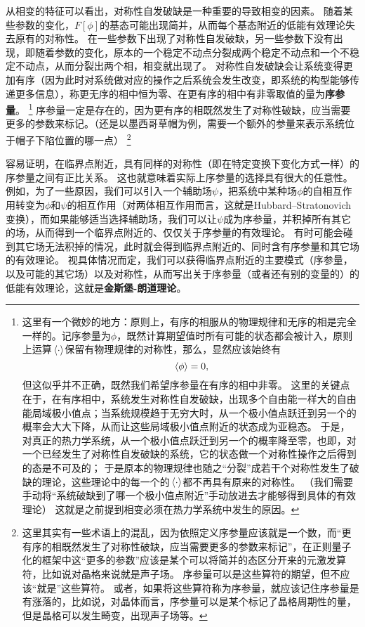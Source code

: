 \documentclass[hyperref, UTF8, a4paper]{ctexart}
\begin{document}
从相变的特征可以看出，对称性自发破缺是一种重要的导致相变的因素。
随着某些参数的变化，$F[\phi]$的基态可能出现简并，从而每个基态附近的低能有效理论失去原有的对称性。
在一些参数下出现了对称性自发破缺，另一些参数下没有出现，即随着参数的变化，原本的一个稳定不动点分裂成两个稳定不动点和一个不稳定不动点，从而分裂出两个相，相变就出现了。
对称性自发破缺会让系统变得更加有序（因为此时对系统做对应的操作之后系统会发生改变，即系统的构型能够传递更多信息），称更无序的相中恒为零、在更有序的相中有非零取值的量为\textbf{序参量}。%
\footnote{这里有一个微妙的地方：原则上，有序的相服从的物理规律和无序的相是完全一样的。记序参量为$\phi$，既然计算期望值时所有可能的状态都会被计入，原则上运算$\expval*{\cdot}$保留有物理规律的对称性，那么，显然应该始终有
\[
    \expval*{\phi} = 0,
\]
但这似乎并不正确，既然我们希望序参量在有序的相中非零。
这里的关键点在于，在有序相中，系统发生对称性自发破缺，出现多个自由能一样大的自由能局域极小值点；当系统规模趋于无穷大时，从一个极小值点跃迁到另一个的概率会大大下降，从而让这些局域极小值点附近的状态成为亚稳态。
于是，对真正的热力学系统，从一个极小值点跃迁到另一个的概率降至零，也即，对一个已经发生了对称性自发破缺的系统，它的状态做一个对称性操作之后得到的态是不可及的；
于是原本的物理规律也随之“分裂”成若干个对称性发生了破缺的理论，这些理论中的每一个的$\expval*{\cdot}$都不再具有原来的对称性。
（我们需要手动将“系统破缺到了哪一个极小值点附近”手动放进去才能够得到具体的有效理论）
这就是之前提到相变必须在热力学系统中发生的原因。
}%
序参量一定是存在的，因为更有序的相既然发生了对称性破缺，应当需要更多的参数来标记。（还是以墨西哥草帽为例，需要一个额外的参量来表示系统位于帽子下陷位置的哪一点）%
\footnote{这里其实有一些术语上的混乱，因为依照定义序参量应该就是一个数，而“更有序的相既然发生了对称性破缺，应当需要更多的参数来标记”，在正则量子化的框架中这“更多的参数”应该是某个可以将简并的态区分开来的元激发算符，比如说对晶格来说就是声子场。
序参量可以是这些算符的期望，但不应该“就是”这些算符。
或者，如果将这些算符称为序参量，就应该记住序参量是有涨落的，比如说，对晶体而言，序参量可以是某个标记了晶格周期性的量，但是晶格可以发生畸变，出现声子场等。}%

容易证明，在临界点附近，具有同样的对称性（即在特定变换下变化方式一样）的序参量之间有正比关系。
这也就意味着实际上序参量的选择具有很大的任意性。
例如，为了一些原因，我们可以引入一个辅助场$\psi$，把系统中某种场$\phi$的自相互作用转变为$\phi$和$\psi$的相互作用（对两体相互作用而言，这就是Hubbard–Stratonovich变换），而如果能够适当选择辅助场，我们可以让$\psi$成为序参量，并积掉所有其它的场，从而得到一个临界点附近的、仅仅关于序参量的有效理论。
有时可能会碰到其它场无法积掉的情况，此时就会得到临界点附近的、同时含有序参量和其它场的有效理论。
视具体情况而定，我们可以获得临界点附近的主要模式（序参量，以及可能的其它场）以及对称性，从而写出关于序参量（或者还有别的变量的）的低能有效理论，这就是\textbf{金斯堡-朗道理论}。
\end{document}
